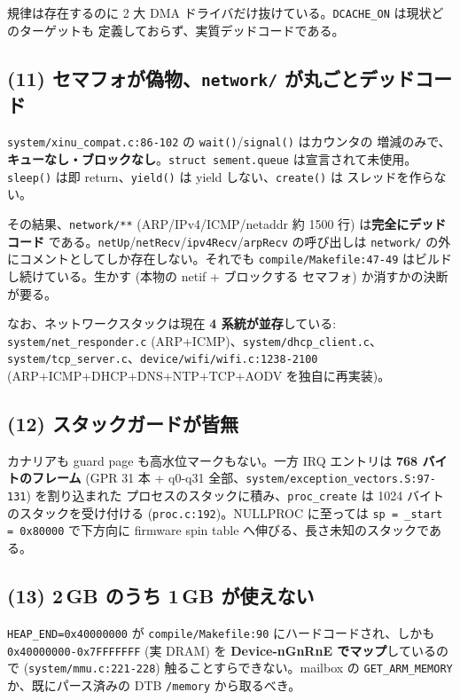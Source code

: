 \documentclass[a4paper,11pt]{ltjsarticle}
\begin{document}
規律は存在するのに 2 大 DMA ドライバだけ抜けている。\texttt{DCACHE\_ON} は現状どのターゲットも
定義しておらず、実質デッドコードである。

\subsection{(11) セマフォが偽物、\texttt{network/} が丸ごとデッドコード}

\texttt{system/xinu\_compat.c:86-102} の \texttt{wait()}/\texttt{signal()} はカウンタの
増減のみで、\textbf{キューなし・ブロックなし}。\texttt{struct sement.queue} は宣言されて未使用。
\texttt{sleep()} は即 return、\texttt{yield()} は yield しない、\texttt{create()} は
スレッドを作らない。

その結果、\texttt{network/**} (ARP/IPv4/ICMP/netaddr 約 1500 行) は\textbf{完全にデッドコード}
である。\texttt{netUp}/\texttt{netRecv}/\texttt{ipv4Recv}/\texttt{arpRecv} の呼び出しは
\texttt{network/} の外にコメントとしてしか存在しない。それでも
\texttt{compile/Makefile:47-49} はビルドし続けている。生かす (本物の netif + ブロックする
セマフォ) か消すかの決断が要る。

なお、ネットワークスタックは現在\textbf{ 4 系統が並存}している:
\texttt{system/net\_responder.c} (ARP+ICMP)、\texttt{system/dhcp\_client.c}、
\texttt{system/tcp\_server.c}、\texttt{device/wifi/wifi.c:1238-2100}
(ARP+ICMP+DHCP+DNS+NTP+TCP+AODV を独自に再実装)。

\subsection{(12) スタックガードが皆無}

カナリアも guard page も高水位マークもない。一方 IRQ エントリは\textbf{ 768 バイトのフレーム}
(GPR 31 本 + q0-q31 全部、\texttt{system/exception\_vectors.S:97-131}) を割り込まれた
プロセスのスタックに積み、\texttt{proc\_create} は 1024 バイトのスタックを受け付ける
(\texttt{proc.c:192})。NULLPROC に至っては \texttt{sp = \_start = 0x80000} で下方向に
firmware spin table へ伸びる、長さ未知のスタックである。

\subsection{(13) 2\,GB のうち 1\,GB が使えない}

\texttt{HEAP\_END=0x40000000} が \texttt{compile/Makefile:90} にハードコードされ、しかも
\texttt{0x40000000-0x7FFFFFFF} (実 DRAM) を\textbf{ Device-nGnRnE でマップ}しているので
(\texttt{system/mmu.c:221-228}) 触ることすらできない。mailbox の
\texttt{GET\_ARM\_MEMORY} か、既にパース済みの DTB \texttt{/memory} から取るべき。
\end{document}
